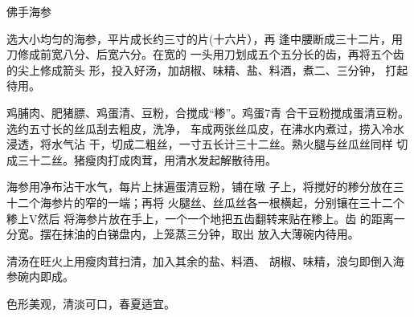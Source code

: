 \begin{recipe}{佛手海参}

\ingredients



\cooking

\step 选大小均匀的海参，平片成长约三寸的片(十六片），再 逢中腰断成三十二片，用刀修成前宽八分、后宽六分。在宽的 一头用刀划成五个五分长的齿，再将五个齿的尖上修成箭头 形，投入好汤，加胡椒、味精、盐、料酒，煮二、三分钟， 打起待用。

鸡脯肉、肥猪膘、鸡蛋清、豆粉，合搅成“糁”。鸡蛋7青 合干豆粉搅成蛋清豆粉。选约五寸长的丝瓜刮去粗皮，洗净， 车成两张丝瓜皮，在沸水内煮过，捞入冷水浸透，将水气沾 干，切成二粗丝，一寸五长计三十二丝。熟火腿与丝瓜丝同样 切成三十二丝。猪瘦肉打成肉茸，用清水发起解散待用。

\step 海参用净布沾干水气，每片上抹遍蛋清豆粉，铺在墩 子上，将搅好的糁分放在三十二个海参片的窄的一端；再将 火腿丝、丝瓜丝各一根横起，分别镶在三十二个糁上V然后 将海参片放在手上，一个一个地把五齿翻转来贴在糁上。齿 的距离一分宽。摆在抹油的白锑盘内，上笼蒸三分钟，取出 放入大薄碗内待用。

\step 清汤在旺火上用瘦肉茸扫清，加入其余的盐、料酒、 胡椒、味精，浪匀即倒入海参碗内即成。

\notes

色形美观，清淡可口，春夏适宜。

\end{recipe}

